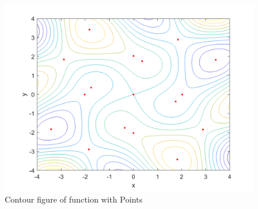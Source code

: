 \begin{figure}[H]
	\caption{Contour figure of function with Points}
	\centering
	\includegraphics[width=12cm]{Q1/figures/ContourWithPoints.png}
\end{figure}

